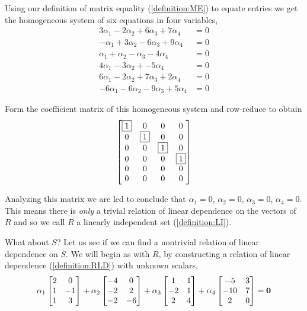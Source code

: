 \documentclass{ximera}
\begin{document}
\begin{example}
  
  Using our definition of matrix equality (\ref{definition:ME}) to equate entries we get the homogeneous system of six equations in four variables,
  \begin{align*}
    3\alpha_1-2\alpha_2+6\alpha_3+7\alpha_4&=0\\
    -\alpha_1+3\alpha_2-6\alpha_3+9\alpha_4&=0\\
    \alpha_1+\alpha_2-\alpha_3-4\alpha_4&=0\\
    4\alpha_1-3\alpha_2+            -5\alpha_4&=0\\
    6\alpha_1-2\alpha_2+7\alpha_3+2\alpha_4&=0\\
    -6\alpha_1-6\alpha_2-9\alpha_3+5\alpha_4&=0
  \end{align*}
  

  Form the coefficient matrix of this homogeneous system and row-reduce to obtain
  \[
    \begin{bmatrix}
      \fbox{1} & 0 & 0 & 0\\
      0 & \fbox{1} & 0 & 0\\
      0 & 0 & \fbox{1} & 0\\
      0 & 0 & 0 & \fbox{1}\\
      0 & 0 & 0 & 0\\
      0 & 0 & 0 & 0
    \end{bmatrix}
  \]
  
  Analyzing this matrix we are led to conclude that $\alpha_1=0$,
  $\alpha_2=0$, $\alpha_3=0$, $\alpha_4=0$.  This means there is
  \textit{only} a trivial relation of linear dependence on the vectors
  of $R$ and so we call $R$ a linearly independent set
  (\ref{definition:LI}).

  What about $S$?  Let us see if we can find a nontrivial relation of
  linear dependence on $S$.  We will begin as with $R$, by
  constructing a relation of linear dependence (\ref{definition:RLD})
  with unknown scalars,
  \[
    \alpha_1\begin{bmatrix}
      2 & 0\\ 1 & -1\\ 1 & 3
    \end{bmatrix}+
    \alpha_2\begin{bmatrix}
      -4 & 0\\ -2 & 2\\ -2 & -6
    \end{bmatrix}+
    \alpha_3\begin{bmatrix}
      1 & 1\\ -2 & 1\\ 2 & 4
    \end{bmatrix}+
    \alpha_4\begin{bmatrix}
      -5 & 3\\ -10 & 7\\ 2 & 0
    \end{bmatrix}=
    \mathbf{0}
  \]
  

\end{example}
\end{document}
